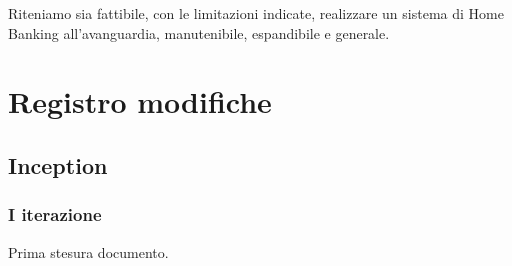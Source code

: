\documentclass[10pt]{softeng} %
\begin{document}
Riteniamo sia fattibile, con le limitazioni indicate, realizzare un sistema di Home Banking all'avanguardia, manutenibile, espandibile e generale.


\section{Registro modifiche}

\subsection{Inception}

\subsubsection{I iterazione}

Prima stesura documento.


\printcustombibsmall{}
\end{document}
